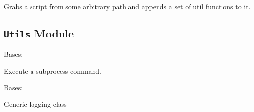 \documentclass[letterpaper,10pt,english]{sphinxmanual}
\begin{document}

\begin{fulllineitems}
\label{ref-manual/XrdTest:XrdTest.TestUtils.resolveScript}
Grabs a script from some arbitrary path and appends a set of util functions
to it.

\end{fulllineitems}



\subsection{\texttt{Utils} Module}
\label{ref-manual/XrdTest:module-XrdTest.Utils}\label{ref-manual/XrdTest:utils-module}

\begin{fulllineitems}
\label{ref-manual/XrdTest:XrdTest.Utils.Command}
Bases: 

Execute a subprocess command.

\begin{fulllineitems}
\label{ref-manual/XrdTest:XrdTest.Utils.Command.execute}
\end{fulllineitems}


\end{fulllineitems}


\begin{fulllineitems}
\label{ref-manual/XrdTest:XrdTest.Utils.Logger}
Bases: 

Generic logging class

\begin{fulllineitems}
\label{ref-manual/XrdTest:XrdTest.Utils.Logger.setup}
\end{fulllineitems}


\end{fulllineitems}
\end{document}

